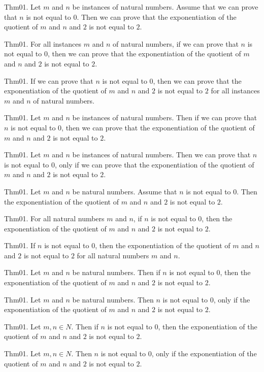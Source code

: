 \documentclass{article}
\begin{document}
Thm01. Let $m$ and $n$ be instances of natural numbers. Assume that we can prove that $n$ is not equal to $0$. Then we can prove that the exponentiation of the quotient of $m$ and $n$ and $2$ is not equal to $2$.

Thm01. For all instances $m$ and $n$ of natural numbers, if we can prove that $n$ is not equal to $0$, then we can prove that the exponentiation of the quotient of $m$ and $n$ and $2$ is not equal to $2$.

Thm01. If we can prove that $n$ is not equal to $0$, then we can prove that the exponentiation of the quotient of $m$ and $n$ and $2$ is not equal to $2$ for all instances $m$ and $n$ of natural numbers.

Thm01. Let $m$ and $n$ be instances of natural numbers. Then if we can prove that $n$ is not equal to $0$, then we can prove that the exponentiation of the quotient of $m$ and $n$ and $2$ is not equal to $2$.

Thm01. Let $m$ and $n$ be instances of natural numbers. Then we can prove that $n$ is not equal to $0$, only if we can prove that the exponentiation of the quotient of $m$ and $n$ and $2$ is not equal to $2$.

Thm01. Let $m$ and $n$ be natural numbers. Assume that $n$ is not equal to $0$. Then the exponentiation of the quotient of $m$ and $n$ and $2$ is not equal to $2$.

Thm01. For all natural numbers $m$ and $n$, if $n$ is not equal to $0$, then the exponentiation of the quotient of $m$ and $n$ and $2$ is not equal to $2$.

Thm01. If $n$ is not equal to $0$, then the exponentiation of the quotient of $m$ and $n$ and $2$ is not equal to $2$ for all natural numbers $m$ and $n$.

Thm01. Let $m$ and $n$ be natural numbers. Then if $n$ is not equal to $0$, then the exponentiation of the quotient of $m$ and $n$ and $2$ is not equal to $2$.

Thm01. Let $m$ and $n$ be natural numbers. Then $n$ is not equal to $0$, only if the exponentiation of the quotient of $m$ and $n$ and $2$ is not equal to $2$.

Thm01. Let $m , n \in N$. Then if $n$ is not equal to $0$, then the exponentiation of the quotient of $m$ and $n$ and $2$ is not equal to $2$.

Thm01. Let $m , n \in N$. Then $n$ is not equal to $0$, only if the exponentiation of the quotient of $m$ and $n$ and $2$ is not equal to $2$.
\end{document}

